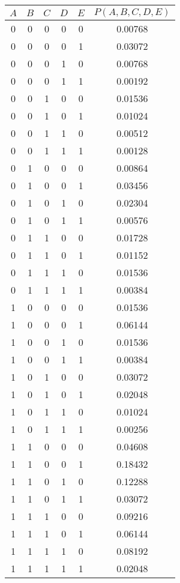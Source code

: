 \documentclass{homework}
\begin{document}
\begin{table}[h!]
    \centering
    \begin{tabular}{ccccc|c}
        $A$ & $B$ & $C$ & $D$ & $E$ & $P(A, B, C, D, E)$ \\
        \midrule
        0 & 0 & 0 & 0 & 0 & 0.00768 \\
        0 & 0 & 0 & 0 & 1 & 0.03072 \\
        0 & 0 & 0 & 1 & 0 & 0.00768 \\
        0 & 0 & 0 & 1 & 1 & 0.00192 \\
        0 & 0 & 1 & 0 & 0 & 0.01536 \\
        0 & 0 & 1 & 0 & 1 & 0.01024 \\
        0 & 0 & 1 & 1 & 0 & 0.00512 \\
        0 & 0 & 1 & 1 & 1 & 0.00128 \\
        0 & 1 & 0 & 0 & 0 & 0.00864 \\
        0 & 1 & 0 & 0 & 1 & 0.03456 \\
        0 & 1 & 0 & 1 & 0 & 0.02304 \\
        0 & 1 & 0 & 1 & 1 & 0.00576 \\
        0 & 1 & 1 & 0 & 0 & 0.01728 \\
        0 & 1 & 1 & 0 & 1 & 0.01152 \\
        0 & 1 & 1 & 1 & 0 & 0.01536 \\
        0 & 1 & 1 & 1 & 1 & 0.00384 \\
        1 & 0 & 0 & 0 & 0 & 0.01536 \\
        1 & 0 & 0 & 0 & 1 & 0.06144 \\
        1 & 0 & 0 & 1 & 0 & 0.01536 \\
        1 & 0 & 0 & 1 & 1 & 0.00384 \\
        1 & 0 & 1 & 0 & 0 & 0.03072 \\
        1 & 0 & 1 & 0 & 1 & 0.02048 \\
        1 & 0 & 1 & 1 & 0 & 0.01024 \\
        1 & 0 & 1 & 1 & 1 & 0.00256 \\
        1 & 1 & 0 & 0 & 0 & 0.04608 \\
        1 & 1 & 0 & 0 & 1 & 0.18432 \\
        1 & 1 & 0 & 1 & 0 & 0.12288 \\
        1 & 1 & 0 & 1 & 1 & 0.03072 \\
        1 & 1 & 1 & 0 & 0 & 0.09216 \\
        1 & 1 & 1 & 0 & 1 & 0.06144 \\
        1 & 1 & 1 & 1 & 0 & 0.08192 \\
        1 & 1 & 1 & 1 & 1 & 0.02048 \\
    \end{tabular}
\end{table}
\end{document}
